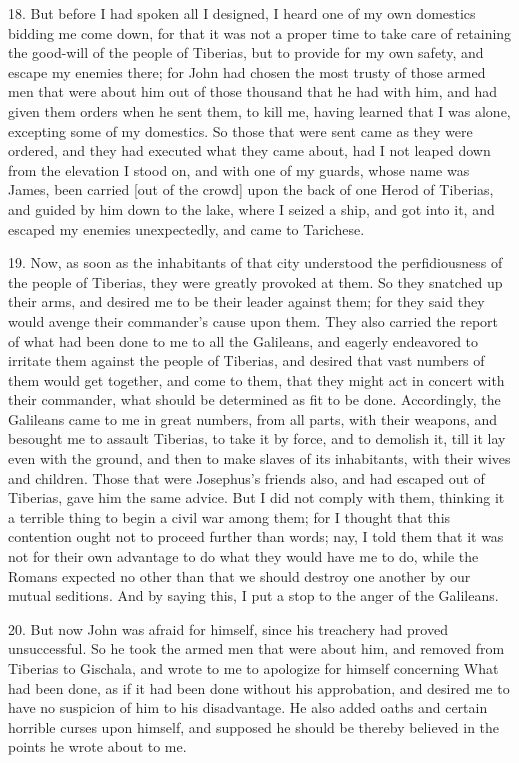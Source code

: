 18. But before I had spoken all I designed, I heard one of my own
domestics bidding me come down, for that it was not a proper time to take
care of retaining the good-will of the people of Tiberias, but to provide
for my own safety, and escape my enemies there; for John had chosen the
most trusty of those armed men that were about him out of those thousand
that he had with him, and had given them orders when he sent them, to kill
me, having learned that I was alone, excepting some of my domestics. So
those that were sent came as they were ordered, and they had executed what
they came about, had I not leaped down from the elevation I stood on, and
with one of my guards, whose name was James, been carried [out of the
crowd] upon the back of one Herod of Tiberias, and guided by him down to
the lake, where I seized a ship, and got into it, and escaped my enemies
unexpectedly, and came to Tarichese.

19. Now, as soon as the inhabitants of that city understood the
perfidiousness of the people of Tiberias, they were greatly provoked at
them. So they snatched up their arms, and desired me to be their leader
against them; for they said they would avenge their commander's cause upon
them. They also carried the report of what had been done to me to all the
Galileans, and eagerly endeavored to irritate them against the people of
Tiberias, and desired that vast numbers of them would get together, and
come to them, that they might act in concert with their commander, what
should be determined as fit to be done. Accordingly, the Galileans came to
me in great numbers, from all parts, with their weapons, and besought me
to assault Tiberias, to take it by force, and to demolish it, till it lay
even with the ground, and then to make slaves of its inhabitants, with
their wives and children. Those that were Josephus's friends also, and had
escaped out of Tiberias, gave him the same advice. But I did not comply
with them, thinking it a terrible thing to begin a civil war among them;
for I thought that this contention ought not to proceed further than
words; nay, I told them that it was not for their own advantage to do what
they would have me to do, while the Romans expected no other than that we
should destroy one another by our mutual seditions. And by saying this, I
put a stop to the anger of the Galileans.

20. But now John was afraid for himself, since his treachery had proved
unsuccessful. So he took the armed men that were about him, and removed
from Tiberias to Gischala, and wrote to me to apologize for himself
concerning What had been done, as if it had been done without his
approbation, and desired me to have no suspicion of him to his
disadvantage. He also added oaths and certain horrible curses upon
himself, and supposed he should be thereby believed in the points he wrote
about to me.

